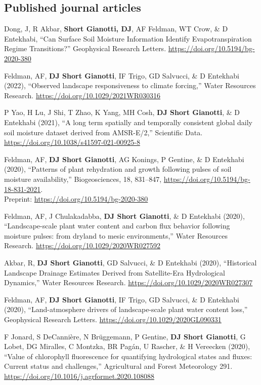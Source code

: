 \documentclass[10pt, a4paper]{article}
\newcommand{\lbr}{\vspace*{12pt}}
\newcommand{\years}[1]{\mbox{}\marginnote{\scriptsize #1}} %
\begin{document}
\subsection*{Published journal articles}
\years{2022b}Dong, J, R Akbar, \textbf{Short Gianotti, DJ}, AF Feldman, WT Crow, \& D Entekhabi, ``Can Surface Soil Moisture Information Identify Evapotranspiration Regime Transitions?'' Geophysical Research Letters. \url{https://doi.org/10.5194/bg-2020-380}\lbr

\years{2022a}Feldman, AF, \textbf{DJ Short Gianotti}, IF Trigo, GD Salvucci, \& D Entekhabi (2022), ``Observed landscape responsiveness to climate forcing,'' Water Resources Research. \url{https://doi.org/10.1029/2021WR030316} \lbr

\years{2021b}P Yao, H Lu, J Shi, T Zhao, K Yang, MH Cosh, \textbf{DJ Short Gianotti}, \& D Entekhabi (2021), ``A long term spatially and temporally consistent global daily soil moisture dataset derived from AMSR-E/2,'' Scientific Data. \url{https://doi.org/10.1038/s41597-021-00925-8} \lbr

\years{2021a}Feldman, AF, \textbf{DJ Short Gianotti}, AG Konings, P Gentine, \& D Entekhabi (2020), ``Patterns of plant rehydration and growth following pulses of soil moisture availability,'' Biogeosciences, 18, 831–847, \url{https://doi.org/10.5194/bg-18-831-2021}. \\Preprint: \url{https://doi.org/10.5194/bg-2020-380}\lbr

\years{2020e}Feldman, AF, J Chulakadabba, \textbf{DJ Short Gianotti}, \& D Entekhabi (2020), ``Landscape-scale plant water content and carbon flux behavior following moisture pulses: from dryland to mesic environments,'' Water Resources Research. \url{https://doi.org/10.1029/2020WR027592}\lbr

\years{2020d}Akbar, R, \textbf{DJ Short Gianotti}, GD Salvucci, \& D Entekhabi (2020), ``Historical Landscape Drainage Estimates Derived from Satellite-Era Hydrological Dynamics,'' Water Resources Research. \url{https://doi.org/10.1029/2020WR027307}\lbr

\years{2020c}Feldman, AF, \textbf{DJ Short Gianotti}, IF Trigo, GD Salvucci, \& D Entekhabi (2020), ``Land-atmosphere drivers of landscape-scale plant water content loss,'' Geophysical Research Letters. \url{https://doi.org/10.1029/2020GL090331}\lbr

\years{2020b}F Jonard, S DeCanni\`ere, N Br\"uggemann, P Gentine, \textbf{DJ Short Gianotti}, G Lobet, DG Miralles, C Montzka, BR Pag\'an, U Rascher, \& H Vereecken (2020), ``Value of chlorophyll fluorescence for quantifying hydrological states and fluxes: Current status and challenges,'' Agricultural and Forest Meteorology 291. \url{https://doi.org/10.1016/j.agrformet.2020.108088} \lbr
\end{document}
